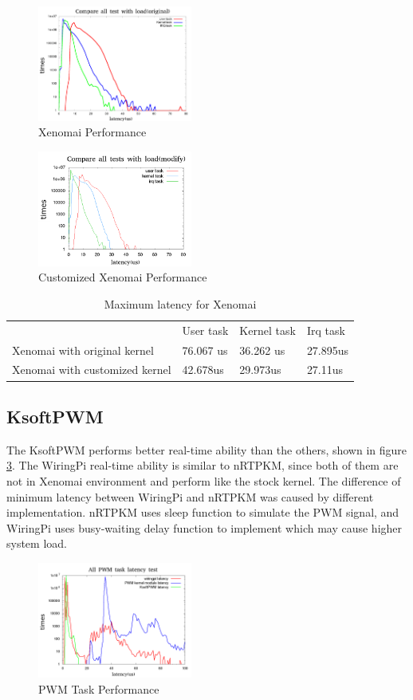 \documentclass[conference]{IEEEtran}
\begin{document}
\begin{figure}
\centering
\includegraphics[width=2in]{img/xenomai_load.png}
\caption{Xenomai Performance}
\label{fig:xeno_perf}
\end{figure}

\begin{figure}
\centering
\includegraphics[width=2in]{img/xenomai_load_modify.png}
\caption{Customized Xenomai Performance}
\label{fig:xeno_perf_modify}
\end{figure}

\begin{table}[]
\centering
\caption{Maximum latency for Xenomai}
\label{xeno_compare}
\begin{tabular}{llll}
                              & User task & Kernel task & Irq task \\
Xenomai with original kernel  & 76.067 us & 36.262 us   & 27.895us \\
Xenomai with customized kernel & 42.678us  & 29.973us    & 27.11us 
\end{tabular}
\end{table}

\subsection{KsoftPWM}

The KsoftPWM performs better real-time ability than the others, shown in figure \ref{fig:ksoftpwm_perf}. The WiringPi real-time ability is similar to nRTPKM, since both of them are not in Xenomai environment and perform like the stock kernel. The difference of minimum latency between WiringPi and nRTPKM was caused by different implementation. nRTPKM uses sleep function to simulate the PWM signal, and WiringPi uses busy-waiting delay function to implement which may cause higher system load.

\begin{figure}
\centering
\includegraphics[width=2in]{img/ksoftpwm_load.png}
\caption{PWM Task Performance}
\label{fig:ksoftpwm_perf}
\end{figure}





\end{document}

